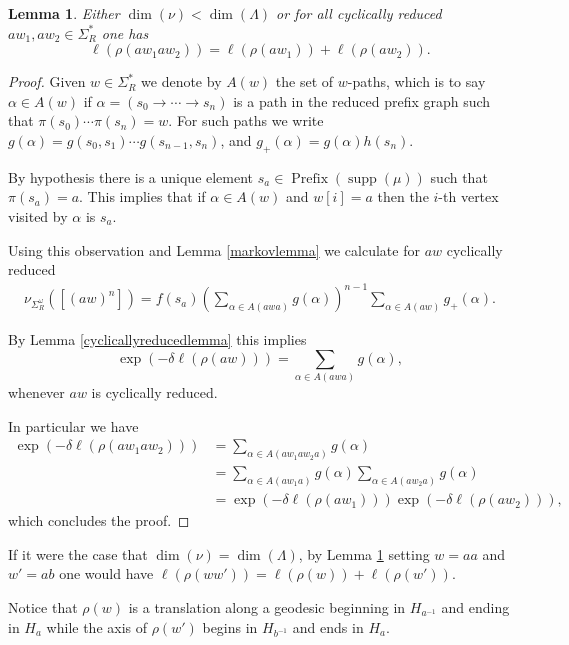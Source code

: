 \documentclass{article}
\newtheorem{lemma}{Lemma}
\DeclareMathOperator{\supp}{supp}
\DeclareMathOperator{\prefix}{Prefix}
\begin{document}
\begin{lemma}\label{additivelemma}
  Either \(\dim(\nu) < \dim(\Lambda)\) or for all cyclically reduced \(aw_1, aw_2 \in \Sigma^*_R\) one has
  \[\ell(\rho(aw_1aw_2)) = \ell(\rho(aw_1)) + \ell(\rho(aw_2)).\]
\end{lemma}
\begin{proof}
  
  Given \(w \in \Sigma^*_R\) we denote by \(A(w)\) the set of \(w\)-paths, which is to say \(\alpha \in A(w)\) if \(\alpha =  (s_0 \rightarrow \cdots \rightarrow s_n)\) is a path in the reduced prefix graph such that \(\pi(s_0)\cdots \pi(s_{n}) = w\).   For such paths we write \(g(\alpha) = g(s_0,s_1)\cdots g(s_{n-1},s_n)\), and \(g_+(\alpha) = g(\alpha)h(s_n)\).  
  
  By hypothesis there is a unique element \(s_a \in \prefix(\supp(\mu))\) such that \(\pi(s_a) = a\).   This implies that if \(\alpha \in A(w)\) and \(w[i] = a\) then the \(i\)-th vertex visited by \(\alpha\) is \(s_a\).

  Using this observation and Lemma \ref{markovlemma} we calculate for \(aw\) cyclically reduced 
  \begin{align*}
 \nu_{\Sigma^\omega_R}([(aw)^n]) = f(s_a)\left(\sum\limits_{\alpha \in A(awa)}g(\alpha)\right)^{n-1}\sum\limits_{\alpha \in A(aw)}g_+(\alpha).
  \end{align*}
  
  By Lemma \ref{cyclicallyreducedlemma} this implies
  \[\exp(-\delta \ell(\rho(aw))) = \sum\limits_{\alpha \in A(awa)}g(\alpha),\]
  whenever \(aw\) is cyclically reduced.
  
  In particular we have
  \begin{align*}\exp(-\delta \ell(\rho(aw_1aw_2))) &= \sum\limits_{\alpha \in A(aw_1aw_2a)}g(\alpha)
  \\ &= \sum\limits_{\alpha \in A(aw_1a)}g(\alpha) \sum\limits_{\alpha \in A(aw_2a)}g(\alpha)
  \\ &= \exp(-\delta\ell(\rho(aw_1)))\exp(-\delta\ell(\rho(aw_2))),
  \end{align*}
  which concludes the proof.
\end{proof}

If it were the case that \(\dim(\nu) = \dim(\Lambda)\), by Lemma \ref{additivelemma} setting \(w = aa\) and \(w' = ab\) one would have \(\ell(\rho(ww')) = \ell(\rho(w)) + \ell(\rho(w'))\).

Notice that \(\rho(w)\) is a translation along a geodesic beginning in \(H_{a^{-1}}\) and ending in \(H_a\) while the axis of \(\rho(w')\) begins in \(H_{b^{-1}}\) and ends in \(H_a\).  
\end{document}
